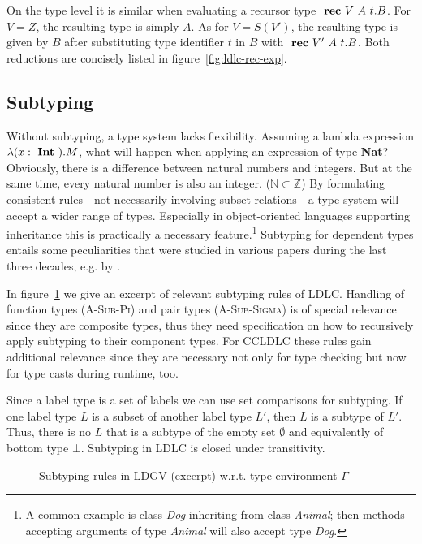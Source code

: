 On the type level it is similar when evaluating a recursor type $\text{ \textbf{rec} } V~A~t.B$. For $V=Z$, the resulting type is simply $A$. As for $V=S(V')$, the resulting type is given by $B$ after substituting type identifier $t$ in $B$ with $\text{ \textbf{rec} } V'~A~t.B$. Both reductions are concisely listed in figure~\ref{fig:ldlc-rec-exp}.

\subsection{Subtyping}

Without subtyping, a type system lacks flexibility. Assuming a lambda expression $\lambda ( x: \text{ \textbf{Int} } ).M$, what will happen when applying an expression of type \textbf{Nat}? Obviously, there is a difference between natural numbers and integers. But at the same time, every natural number is also an integer. ($\mathbb{N} \subset \mathbb{Z}$) By formulating consistent rules---not necessarily involving subset relations---a type system will accept a wider range of types. Especially in object-oriented languages supporting inheritance this is practically a necessary feature.\footnote{A common example is class \emph{Dog} inheriting from class \emph{Animal}; then methods accepting arguments of type \emph{Animal} will also accept type \emph{Dog}.} Subtyping for dependent types entails some peculiarities that were  studied in various papers during the last three decades, e.g. by \cite{aspinall2001}.

In figure~\ref{fig:ldgv-subtyping} we give an excerpt of relevant subtyping rules of LDLC. Handling of function types (\textsc{A-Sub-Pi}) and pair types (\textsc{A-Sub-Sigma}) is of special relevance since they are composite types, thus they need specification on how to recursively apply subtyping to their component types. For CCLDLC these rules gain additional relevance since they are necessary not only for type checking but now for type casts during runtime, too.

Since a label type is a set of labels we can use set comparisons for subtyping. If one label type $L$ is a subset of another label type $L'$, then $L$ is a subtype of $L'$. Thus, there is no $L$ that is a subtype of the empty set $\emptyset$ and equivalently of bottom type $\bot$. Subtyping in LDLC is closed under transitivity.

\begin{figure}
\caption[Subtyping rules in LDGV (excerpt)]{Subtyping rules in LDGV (excerpt) w.r.t. type environment $\Gamma$}
\label{fig:ldgv-subtyping}
\end{figure}


